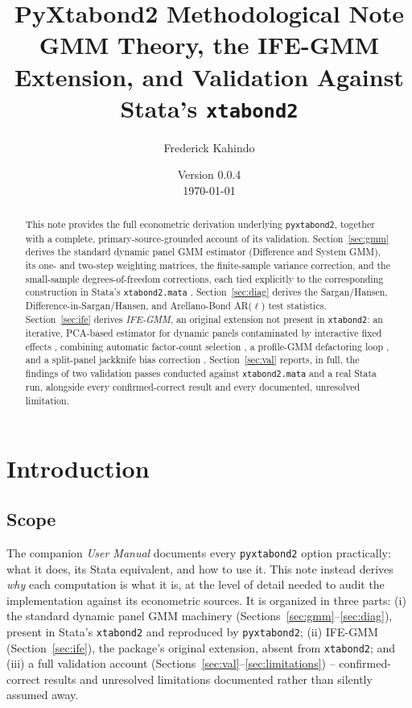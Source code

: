 \documentclass[11pt,a4paper]{article}
\title{\textbf{PyXtabond2 Methodological Note}\\[0.4em]\Large GMM Theory, the IFE-GMM Extension, and Validation Against Stata's \texttt{xtabond2}}
\author{Frederick Kahindo}
\date{Version 0.0.4\\ \today}
\newcommand{\pkg}{\texttt{pyxtabond2}}
\begin{document}
\maketitle

\begin{abstract}
\noindent This note provides the full econometric derivation underlying
\pkg{}, together with a complete, primary-source-grounded account of its
validation. Section~\ref{sec:gmm} derives the standard dynamic panel GMM
estimator (Difference and System GMM), its one- and two-step weighting
matrices, the \citet{Windmeijer2005} finite-sample variance correction, and
the small-sample degrees-of-freedom corrections, each tied explicitly to the
corresponding construction in Stata's \texttt{xtabond2.mata}
\citep{Roodman2009a}. Section~\ref{sec:diag} derives the Sargan/Hansen,
Difference-in-Sargan/Hansen, and Arellano-Bond AR($\ell$) test statistics.
Section~\ref{sec:ife} derives \emph{IFE-GMM}, an original extension not
present in \texttt{xtabond2}: an iterative, PCA-based estimator for dynamic
panels contaminated by interactive fixed effects \citep{Bai2009}, combining
automatic factor-count selection \citep{BaiNg2002, AhnHorenstein2013}, a
profile-GMM defactoring loop \citep{HongSuJiang2022}, and a split-panel
jackknife bias correction \citep{DhaeneJochmans2015}. Section~\ref{sec:val} reports, in full, the findings of two validation
passes conducted against \texttt{xtabond2.mata} and a real Stata run,
alongside every confirmed-correct result and every documented, unresolved
limitation.
\end{abstract}

\newpage
\tableofcontents

\newpage
\section{Introduction}

\subsection{Scope}

The companion \emph{User Manual} documents every \pkg{} option practically:
what it does, its Stata equivalent, and how to use it. This note instead
derives \emph{why} each computation is what it is, at the level of detail
needed to audit the implementation against its econometric sources. It is
organized in three parts: (i) the standard dynamic panel GMM machinery
(Sections~\ref{sec:gmm}--\ref{sec:diag}), present in Stata's \texttt{xtabond2}
and reproduced by \pkg{}; (ii) IFE-GMM (Section~\ref{sec:ife}), the package's
original extension, absent from \texttt{xtabond2}; and (iii) a full
validation account (Sections~\ref{sec:val}--\ref{sec:limitations}) --
confirmed-correct results and unresolved limitations documented rather than
silently assumed away.
\end{document}
